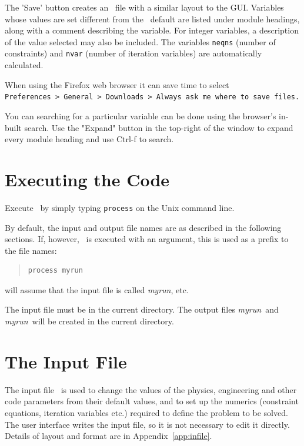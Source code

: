 The 'Save' button creates an \indat\ file with a similar layout to the GUI. Variables whose values are set different from the \process\ default are listed under module headings, along with a comment describing the variable. For integer variables, a description of the value
selected may also be included. The variables \texttt{neqns} (number of constraints) and \texttt{nvar} (number of iteration variables) are automatically calculated.

When using the Firefox web browser it can save time to select \\
\texttt{Preferences > General > Downloads > Always ask me where to save files.}

You can searching for a particular variable can be done using the browser's in-built search. Use the "Expand" button in the top-right of the window to expand every module heading and use Ctrl-f to search.

\section{Executing the Code}

Execute \process\ by simply typing \texttt{process} on the Unix command line.

By default, the input and output file names are as described in the following
sections. If, however, \process\ is executed with an argument, this is used as
a prefix to the file names:
\begin{quote}
\begin{verbatim}
process myrun
\end{verbatim}
\end{quote}
will assume that the input file is called \textit{myrun}\indat, etc.

The input file must be in the current directory.  The output files \textit{myrun}\outdat\
and \textit{myrun}\mfile\ will be created in the current directory.

\section{The Input File}
\label{sec:infile}

The input file \indat\ is used to change the values of the physics,
engineering and other code parameters from their default values, and to set up
the numerics (constraint equations, iteration variables etc.) required to
define the problem to be solved.  The user interface writes the input file, so
it is not necessary to edit it directly.  Details of layout and format are in
Appendix~\ref{app:infile}.

